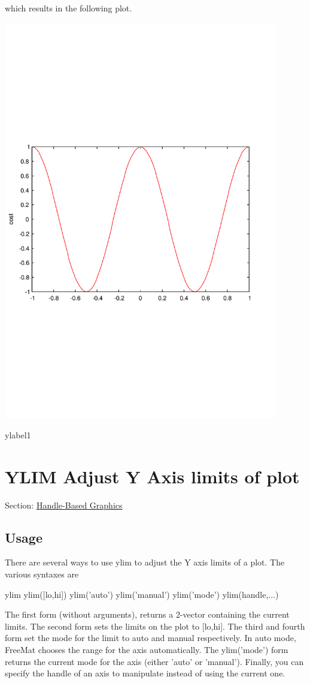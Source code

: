 which results in the following plot.  
\begin{DoxyImage}
\includegraphics[width=12cm]{ylabel1}
\caption{ylabel1}
\end{DoxyImage}
 \hypertarget{handle_ylim}{}\section{Y\-L\-I\-M Adjust Y Axis limits of plot}\label{handle_ylim}
Section\-: \hyperlink{sec_handle}{Handle-\/\-Based Graphics} \hypertarget{vtkwidgets_vtkxyplotwidget_Usage}{}\subsection{Usage}\label{vtkwidgets_vtkxyplotwidget_Usage}
There are several ways to use {\ttfamily ylim} to adjust the Y axis limits of a plot. The various syntaxes are \begin{DoxyVerb}   ylim
   ylim([lo,hi])   
   ylim('auto')
   ylim('manual')
   ylim('mode')
   ylim(handle,...)
\end{DoxyVerb}
 The first form (without arguments), returns a 2-\/vector containing the current limits. The second form sets the limits on the plot to {\ttfamily \mbox{[}lo,hi\mbox{]}}. The third and fourth form set the mode for the limit to {\ttfamily auto} and {\ttfamily manual} respectively. In {\ttfamily auto} mode, Free\-Mat chooses the range for the axis automatically. The {\ttfamily ylim('mode')} form returns the current mode for the axis (either {\ttfamily 'auto'} or {\ttfamily 'manual'}). Finally, you can specify the handle of an axis to manipulate instead of using the current one.

